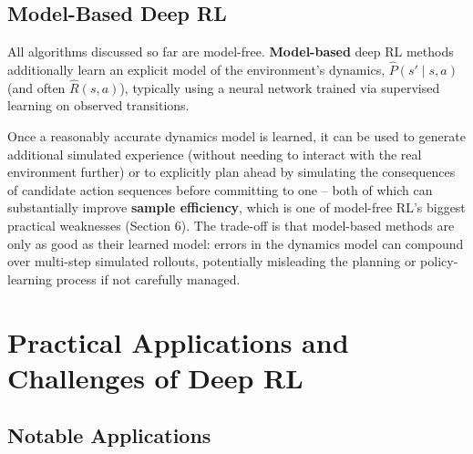 \documentclass[12pt,a4paper]{article}
\begin{document}
\subsection{Model-Based Deep RL}

All algorithms discussed so far are model-free. \textbf{Model-based} deep RL methods additionally learn an explicit model of the environment's dynamics, $\hat P(s'\mid s,a)$ (and often $\hat R(s,a)$), typically using a neural network trained via supervised learning on observed transitions.

\begin{keyidea}
Once a reasonably accurate dynamics model is learned, it can be used to generate additional simulated experience (without needing to interact with the real environment further) or to explicitly plan ahead by simulating the consequences of candidate action sequences before committing to one -- both of which can substantially improve \textbf{sample efficiency}, which is one of model-free RL's biggest practical weaknesses (Section 6). The trade-off is that model-based methods are only as good as their learned model: errors in the dynamics model can compound over multi-step simulated rollouts, potentially misleading the planning or policy-learning process if not carefully managed.
\end{keyidea}

\newpage

\section{Practical Applications and Challenges of Deep RL}

\subsection{Notable Applications}
\end{document}
